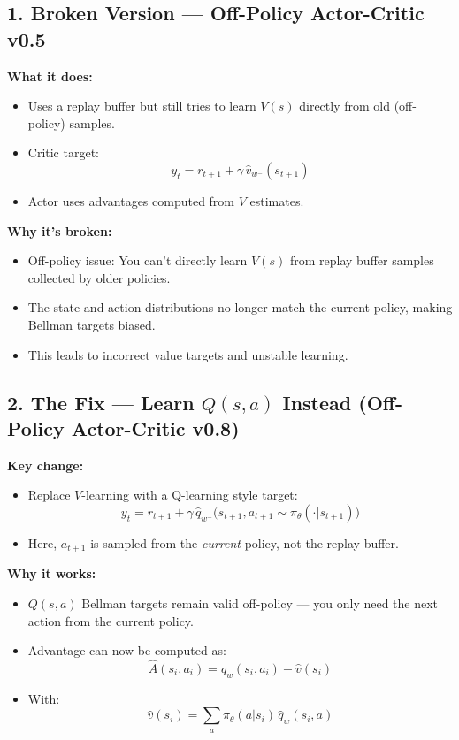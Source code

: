 \documentclass[12pt]{article}
\begin{document}
\subsection*{1. Broken Version --- Off-Policy Actor-Critic v0.5}
\textbf{What it does:}
\begin{itemize}
    \item Uses a replay buffer but still tries to learn $V(s)$ directly from old (off-policy) samples.
    \item Critic target:
    \[
        y_t = r_{t+1} + \gamma \, \hat{v}_{w^-}(s_{t+1})
    \]
    \item Actor uses advantages computed from $V$ estimates.
\end{itemize}

\textbf{Why it’s broken:}
\begin{itemize}
    \item Off-policy issue: You can’t directly learn $V(s)$ from replay buffer samples collected by older policies.
    \item The state and action distributions no longer match the current policy, making Bellman targets biased.
    \item This leads to incorrect value targets and unstable learning.
\end{itemize}

\subsection*{2. The Fix --- Learn $Q(s,a)$ Instead (Off-Policy Actor-Critic v0.8)}
\textbf{Key change:}
\begin{itemize}
    \item Replace $V$-learning with a Q-learning style target:
    \[
        y_t = r_{t+1} + \gamma \, \hat{q}_{w^-}\big(s_{t+1}, a_{t+1} \sim \pi_\theta(\cdot|s_{t+1})\big)
    \]
    \item Here, $a_{t+1}$ is sampled from the \emph{current} policy, not the replay buffer.
\end{itemize}

\textbf{Why it works:}
\begin{itemize}
    \item $Q(s,a)$ Bellman targets remain valid off-policy — you only need the next action from the current policy.
    \item Advantage can now be computed as:
    \[
        \hat{A}(s_i,a_i) = \hat{q}_w(s_i,a_i) - \hat{v}(s_i)
    \]
    \item With:
    \[
        \hat{v}(s_i) = \sum_a \pi_\theta(a|s_i) \, \hat{q}_w(s_i,a)
    \]
\end{itemize}
\end{document}
